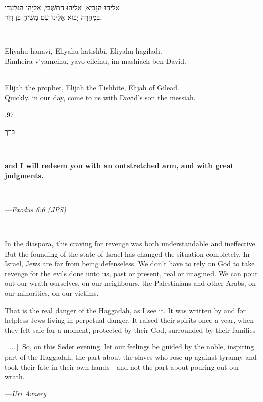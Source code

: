 \documentclass[letter,11pt,openany]{memoir}
\newcommand{\HgInst}[1]{{
\noindent\sffamily{\bfseries{#1}}}}
\newcommand{\HgEllipsis}{\ensuremath{\left[\ldots\right]}}
\newcommand{\HgSource}[1]{\hfill{\small---\itshape{#1}}}
\newcommand{\hchapter}[1]{ 
\begin{hebrew}
	\begin{Spacing}
		{.97} 
		\newpage \strut
		
		\vspace{.15em}
		\begin{flushleft}
			\noindent\Huge #1 
		\end{flushleft}
		
		\vspace{1em} 
	\end{Spacing}
\end{hebrew}

}
\newcommand{\HgHL}[1]{{\Large\textbf{#1}\par
\noindent\\[-.5em]}}
\newcommand{\HgFill}{
\vfill \hrule 
\vfill}
\newenvironment{HgEnglish}{\strut\\
\noindent}{\vspace{1em}}
\newenvironment{HgTranslit}{\strut\\
\noindent
\begin{itshape}
	}{
\end{itshape}
\vspace{1em}}
\newenvironment{HgHebrew}{
\begin{hebrew}
	\strut\\
	\noindent\LARGE}{
\end{hebrew}
}
\begin{document}
\HgInst{Now sing:} \vspace{-1em}
\begin{HgHebrew}
	אֵלִיָהוּ הַנָבִיא, אֵלִיָהוּ הַתִּשְׁבִּי, אֵלִיָהוּ הַגִלְעָדִי \\
	בִּמְהֵרָה יָבוֹא אֵלֵינוּ עִם מָשִׁיחַ בֶּן דָוִד. 
\end{HgHebrew}
\begin{HgTranslit}
	Eliyahu hanavi, Eliyahu hatishbi, Eliyahu hagiladi. \\
	Bimheira v'yameinu, yavo eileinu, im mashiach ben David. 
\end{HgTranslit}
\vspace{-1em}
\begin{HgEnglish}
	Elijah the prophet, Elijah the Tishbite, Elijah of Gilead. \\
	Quickly, in our day, come to us with David's son the messiah. 
\end{HgEnglish}

\hchapter{ברך \\
{\LARGE \strut}}
\begin{HgEnglish}
	\HgHL{and I will redeem you with an outstretched arm, and with great judgments.}
	
	\vspace{-2em} \HgSource{Exodus 6:6 (JPS)} 
\end{HgEnglish}

\HgFill
\begin{HgEnglish}
	In the diaspora, this craving for revenge was both understandable and ineffective. But the founding of the state of Israel has changed the situation completely. In Israel, Jews are far from being defenseless. We don’t have to rely on God to take revenge for the evils done unto us, past or present, real or imagined. We can pour out our wrath ourselves, on our neighbours, the Palestinians and other Arabs, on our minorities, on our victims.
	
	That is the real danger of the Haggadah, as I see it. It was written by and for helpless Jews living in perpetual danger. It raised their spirits once a year, when they felt safe for a moment, protected by their God, surrounded by their families
	
	\HgEllipsis{} So, on this Seder evening, let our feelings be guided by the noble, inspiring part of the Haggadah, the part about the slaves who rose up against tyranny and took their fate in their own hands---and not the part about pouring out our wrath.
	
	\HgSource{Uri Avnery} 
\end{HgEnglish}
\end{document}
